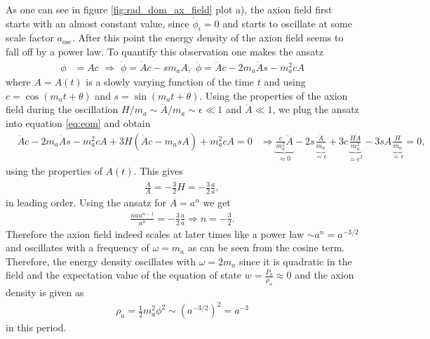 \documentclass[twoside,a4paper, 12pt]{article}
\numberwithin{equation}{section}
\begin{document}
As one can see in figure \ref{fig:rad_dom_ax_field} plot a), the axion field first starts with an almost constant value, since $\dot{\phi}_i = 0$ and starts to oscillate
at some scale factor $a_\mathrm{osc}$. After this point the energy density of the axion field seems to fall off by a power law. To quantify this observation one makes the ansatz \cite[Chap 4.3.1, Page 28]{MarshAxionCosmo}
\begin{align*}
    \phi &= A c \, \, \Rightarrow \,\,
    \dot{\phi} = \dot{A} c - s m_a A, \, \,
    \ddot{\phi} = \ddot{A} c - 2 m_a \dot{A} s - m_a^2 c A
\end{align*}
where $A = A(t)$ is a slowly varying function of the time $t$ and using $c = \cos(m_a t + \theta)$ and 
$s = \sin(m_a t + \theta)$. Using the properties of the axion field during the oscillation 
$H / m_a \sim \dot{A} / m_a \sim \epsilon \ll 1$ and $\ddot{A} \ll 1$,
we plug the ansatz into equation \eqref{eq:eom} and obtain
\begin{align*}
    &\ddot{A} c - 2 m_a \dot{A} s - m_a^2 c A + 3 H ( \dot{A} c - m_a s A) + m_a^2 c A = 0
    &\Rightarrow \underbrace{\frac{c}{m_a^2} \ddot{A}}_{\approx 0} - 2 s \underbrace{\frac{\dot{A}}{m_a}}_{= \epsilon} + 3c \underbrace{\frac{H \dot{A}}{m_a^2}}_{= \epsilon^2} - 3 s A \underbrace{\frac{H}{m_a}}_{= \epsilon} = 0,
\end{align*}
using the properties of $A(t)$.
This gives
\begin{align*}
    \frac{\dot{A}}{A} = - \frac{3}{2} H = - \frac{3}{2} \frac{\dot{a}}{a},
\end{align*}
in leading order.
Using the ansatz for $A = a^n$ we get
\begin{align*}
    \frac{n \dot{a} a^{n - 1}}{a^n} = - \frac{3}{2} \frac{\dot{a}}{a} \Rightarrow n = - \frac{3}{2}.
\end{align*}
Therefore the axion field indeed scales at later times like a power law $\sim a^n = a^{-3/2}$
and oscillates with a frequency of $\omega = m_a$ as can be seen from
the cosine term. Therefore, the energy density oscillates with $\omega = 2 m_a$
since it is quadratic in the field and
the expectation value of the equation of state $w = \frac{P_a}{\rho_a} \approx 0$ and the axion density is given as
\begin{align*}
    \rho_a = \frac{1}{2}m_a^2\phi^2 \sim \left(a^{-3/2}\right)^2 = a^{-3}
\end{align*}
in this period. 
\end{document}
